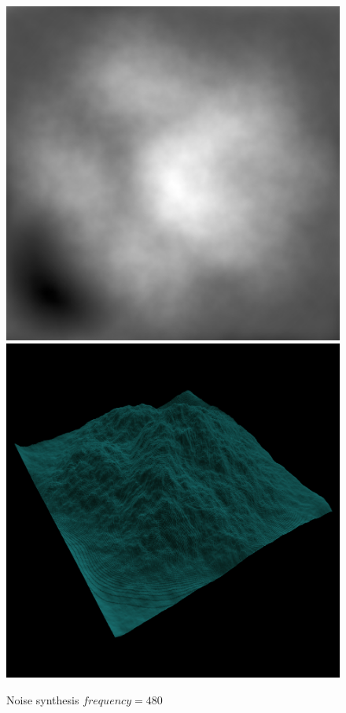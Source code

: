 \begin{figure}[H]
	  \\[0.25em]                                                                
	  \includegraphics[width=\imagewidth]{images/results/terrains/512-1/simplex/480}
	  \includegraphics[width=\imagewidth]{images/results/terrains/512-1/simplex/480_3d}
	  \caption{Noise synthesis $frequency = 480$}                                
	  \label{fig:ex-noise480-surface}
	\end{figure}
	
